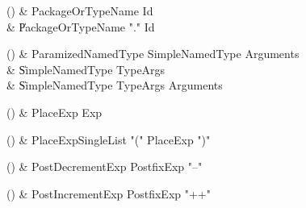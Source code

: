 \begin{bbgrammarappendix}

() & PackageOrTypeName \label{prod:PackageOrTypeName}  \: Id  \\

 &    \| PackageOrTypeName \xcd"." Id \\

\end{bbgrammarappendix}

\begin{bbgrammarappendix}

() & ParamizedNamedType \label{prod:ParamizedNamedType}  \: SimpleNamedType Arguments  \\

 &    \| SimpleNamedType TypeArgs \\
 &    \| SimpleNamedType TypeArgs Arguments \\

\end{bbgrammarappendix}

\begin{bbgrammarappendix}

() & PlaceExp \label{prod:PlaceExp}  \: Exp  \\


\end{bbgrammarappendix}

\begin{bbgrammarappendix}

() & PlaceExpSingleList \label{prod:PlaceExpSingleList}  \: \xcd"(" PlaceExp \xcd")"  \\


\end{bbgrammarappendix}

\begin{bbgrammarappendix}

() & PostDecrementExp \label{prod:PostDecrementExp}  \: PostfixExp \xcd"--"  \\


\end{bbgrammarappendix}

\begin{bbgrammarappendix}

() & PostIncrementExp \label{prod:PostIncrementExp}  \: PostfixExp \xcd"++"  \\


\end{bbgrammarappendix}

